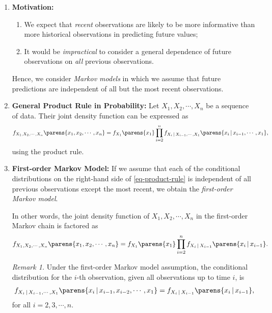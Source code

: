 \documentclass[12pt]{article}
\begin{document}
\begin{enumerate}[label=\textbf{\arabic*.}]

	\item \textbf{Motivation:} 
	\begin{enumerate}
		\item We expect that \emph{recent} observations are likely to be more informative than more historical observations in predicting future values; 
		\item It would be \emph{impractical} to consider a general dependence of future observations on \emph{all} previous observations. 
	\end{enumerate}
	Hence, we consider \emph{Markov models} in which we assume that future predictions are independent of all but the most recent observations. 
	
	\item \textbf{General Product Rule in Probability:} Let $X_1, X_2, \cdots, X_n$ be a sequence of data. Their joint density function can be expressed as 
	\begin{align}\label{eq-product-rule}
		f_{X_1, X_2, \cdots, X_n} \parens{x_1, x_2, \cdots, x_n} = f_{X_1} \parens{x_1} \prod_{i=2}^n f_{X_i \,\vert\, X_{i-1}, \cdots, X_{1}} \parens{x_i \,\vert\, x_{i-1}, \cdots, x_1}, 
	\end{align}
	using the product rule. 
	
	\item \textbf{First-order Markov Model:} If we assume that each of the conditional distributions on the right-hand side of \eqref{eq-product-rule} is independent of all previous observations except the most recent, we obtain the \emph{first-order Markov model}. 
	
	In other words, the joint density function of $X_1, X_2, \cdots, X_n$ in the first-order Markov chain is factored as 
	\begin{align}
		f_{X_1, X_2, \cdots, X_n} \parens{x_1, x_2, \cdots, x_n} = f_{X_1} \parens{x_1} \prod_{i=2}^n f_{X_i \,\vert\, X_{i-1}} \parens{x_i \,\vert\, x_{i-1}}. 
	\end{align}
	
	\textit{Remark 1.} Under the first-order Markov model assumption, the conditional distribution for the $i$-th observation, given all observations up to time $i$, is 
	\begin{align*}
		f_{X_i \,\vert\, X_{i-1}, \cdots, X_{1}} \parens{x_i \,\vert\, x_{i-1}, x_{i-2}, \cdots, x_1} = f_{X_i \,\vert\, X_{i-1}} \parens{x_i \,\vert\, x_{i-1}}, 
	\end{align*}
	for all $i = 2, 3, \cdots, n$. 
	

\end{enumerate}
\end{document}
